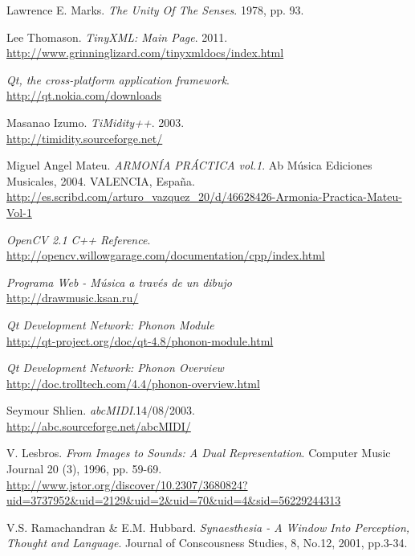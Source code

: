 \begin{thebibliography}{9}
 Lawrence E. Marks. \emph{The Unity Of The Senses}. 1978, pp. 93.
 
  Lee Thomason. \emph{TinyXML: Main Page}. 2011.\\
  \url{http://www.grinninglizard.com/tinyxmldocs/index.html}
 
  \emph{Qt, the cross-platform application framework}.\\
  \url{http://qt.nokia.com/downloads}

  Masanao Izumo. \emph{TiMidity++}. 2003.\\
  \url{http://timidity.sourceforge.net/}
  
	Miguel Angel Mateu. \emph{ARMONÍA PRÁCTICA vol.1}. Ab Música Ediciones Musicales, 2004. VALENCIA, España.\\
	\url{http://es.scribd.com/arturo_vazquez_20/d/46628426-Armonia-Practica-Mateu-Vol-1}
  
  \emph{OpenCV 2.1 C++ Reference}.\\
  \url{http://opencv.willowgarage.com/documentation/cpp/index.html}

\emph{Programa Web - Música a través de un dibujo}\\
\url{http://drawmusic.ksan.ru/}

 \emph{Qt Development Network: Phonon Module}\\
 \url{http://qt-project.org/doc/qt-4.8/phonon-module.html}
 
 \emph{Qt Development Network: Phonon Overview}\\
 \url{http://doc.trolltech.com/4.4/phonon-overview.html}

  Seymour Shlien. \emph{abcMIDI}.14/08/2003.\\
  \url{http://abc.sourceforge.net/abcMIDI/} 

 V. Lesbros. \emph{From Images to Sounds: A Dual Representation}. Computer Music Journal 20 (3), 1996, pp. 59-69.\\
 \url{http://www.jstor.org/discover/10.2307/3680824?uid=3737952&uid=2129&uid=2&uid=70&uid=4&sid=56229244313}

  V.S. Ramachandran \& E.M. Hubbard. \emph{Synaesthesia - A Window Into Perception, Thought and Language}. Journal of Conscousness Studies, 8, No.12, 2001, pp.3-34.


\end{thebibliography}
